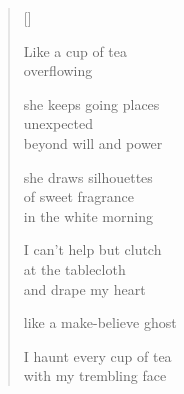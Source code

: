 \documentclass[11pt,a4paper]{article}
\begin{document}
\thispagestyle{empty}

\poemtitle{}

\settowidth{\versewidth}{Like a make-believe ghost}

\bigskip

\begin{verse}[\versewidth]

Like a cup of tea\\
overflowing

she keeps going places\\
unexpected\\
beyond will and power

she draws silhouettes\\
of sweet fragrance\\
in the white morning

I can't help but clutch\\
at the tablecloth\\
and drape my heart

like a make-believe ghost

I haunt every cup of tea\\
with my trembling face
\end{verse}
\end{document}
